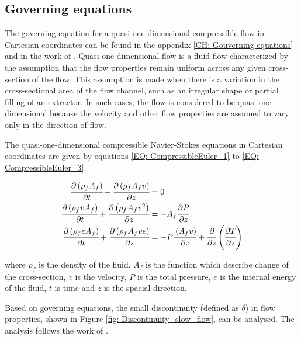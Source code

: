 \documentclass[a4paper,fleqn]{cas-dc}
\begin{document}
\subsection{Governing equations} \label{CH:Governing_equations_chapter}
The governing equation for a quasi-one-dimensional compressible flow in Cartesian coordinates can be found in the appendix \ref{CH: Gouverning equations} and in the work of \citet{Anderson1995}.  Quasi-one-dimensional flow is a fluid flow characterized by the assumption that the flow properties remain uniform across any given cross-section of the flow. This assumption is made when there is a variation in the cross-sectional area of the flow channel, such as an irregular shape or partial filling of an extractor. In such cases, the flow is considered to be quasi-one-dimensional because the velocity and other flow properties are assumed to vary only in the direction of flow.

The quasi-one-dimensional compressible Navier-Stokes equations in Cartesian coordinates are given by equations \ref{EQ: CompressibleEuler_1} to \ref{EQ: CompressibleEuler_3}.

{\footnotesize
	\begin{align}
		\label{EQ: CompressibleEuler_1}
		\cfrac{\partial \left( \rho_f A_f \right) }{\partial t} + \cfrac{\partial \left( \rho_f A_f v \right)}{\partial z} &= 0 \\
		\cfrac{\partial \left( \rho_f v A_f \right) }{\partial t} + \cfrac{\partial \left( \rho_f A_f v^2 \right)}{\partial z} &= -A_f \cfrac{\partial P}{\partial z} \label{EQ: CompressibleEuler_2} \\
		\cfrac{\partial \left( \rho_f e A_f \right) }{\partial t} + \cfrac{\partial \left( \rho_f A_f v e\right)}{\partial z} &= -P\cfrac{\left( A_f v \right)}{\partial z} + \cfrac{\partial}{\partial z} \left( \cfrac{\partial T}{\partial z} \right)   
		\label{EQ: CompressibleEuler_3}
	\end{align}  
}

where $\rho_f$ is the density of the fluid, $A_f$ is the function which describe change of the cross-section, $v$ is the velocity, $P$ is the total pressure, $e$ is the internal energy of the fluid, $t$ is time and $z$ is the spacial direction.

Based on governing equations, the small discontinuity (defined as $\delta$) in flow properties, shown in Figure \ref{fig: Discontinuity_slow_flow}, can be analysed. The analysis follows the work of \citet{Schreier1982}.
\end{document}
